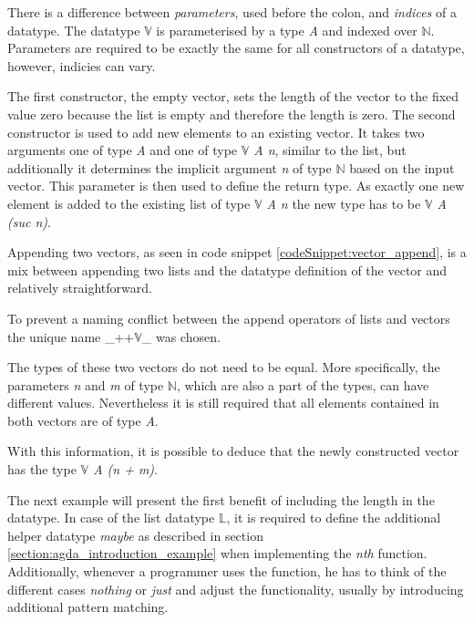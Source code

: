 There is a difference between \emph{parameters}, used before the colon, and \emph{indices} of a datatype.
The datatype $\mathbb{V}$ is parameterised by a type \emph{A} and indexed over $\mathbb{N}$\cite{norell:deptyped}.
Parameters are required to be exactly the same for all constructors of a datatype, however, indicies can vary.

The first constructor, the empty vector, sets the length of the vector to the fixed value zero because the list is empty and therefore the length is zero.
The second constructor is used to add new elements to an existing vector. It takes two arguments one of type \emph{A} and one of type \emph{$\mathbb{V}$ A n}, similar to the list, but additionally it determines the implicit argument \emph{n} of type $\mathbb{N}$ based on the input vector.
This parameter is then used to define the return type. As exactly one new element is added to the existing list of type \emph{$\mathbb{V}$ A n} the new type has to be \emph{$\mathbb{V}$ A (suc n)}.

Appending two vectors, as seen in code snippet \ref{codeSnippet:vector_append}, is a mix between appending two lists and the datatype definition of the vector and relatively straightforward.

\begin{codesnippet}[mathescape=true, caption={Definition of the vector append function in Agda}, label={codeSnippet:vector_append}]
_++$\mathbb{V}$_ : $\forall$ {$\ell$} {A : Set $\ell$}  {n m: $\mathbb{N}$ $\rightarrow$
        $\mathbb{V}$ A n $\rightarrow \mathbb{V}$ A m $\rightarrow \mathbb{V}$ A (n + m)
  []        ++$\mathbb{V}$ ys = ys
  (x :: xs) ++$\mathbb{V}$ ys = x :: (xs ++$\mathbb{V}$ ys)
\end{codesnippet}

To prevent a naming conflict between the append operators of lists and vectors the unique name \_++$\mathbb{V}$\_ was chosen.

The types of these two vectors do not need to be equal. 
More specifically, the parameters \emph{n} and \emph{m} of type $\mathbb{N}$, which are also a part of the types, can have different values. 
Nevertheless it is still required that all elements contained in both vectors are of type \emph{A}.

With this information, it is possible to deduce that the newly constructed vector has the type \emph{$\mathbb{V}$ A (n + m)}.

The next example will present the first benefit of including the length in the datatype.
In case of the list datatype $\mathbb{L}$, it is required to define the additional helper datatype \emph{maybe} as described in section \ref{section:agda_introduction_example} when implementing the \emph{nth} function.
Additionally, whenever a programmer uses the function, he has to think of the different cases \emph{nothing} or \emph{just} and adjust the functionality, usually by introducing additional pattern matching. 


